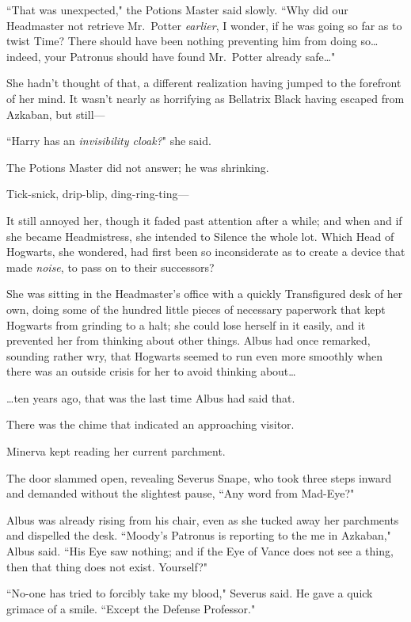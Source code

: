 ``That was unexpected," the Potions Master said slowly. ``Why did our Headmaster not retrieve Mr.~Potter \emph{earlier}, I wonder, if he was going so far as to twist Time? There should have been nothing preventing him from doing so{\ldots} indeed, your Patronus should have found Mr.~Potter already safe{\ldots}"

She hadn't thought of that, a different realization having jumped to the forefront of her mind. It wasn't nearly as horrifying as Bellatrix Black having escaped from Azkaban, but still—

``Harry has an \emph{invisibility cloak?}" she said.

The Potions Master did not answer; he was shrinking.

\later

Tick-snick, drip-blip, ding-ring-ting---

It still annoyed her, though it faded past attention after a while; and when and if she became Headmistress, she intended to Silence the whole lot. Which Head of Hogwarts, she wondered, had first been so inconsiderate as to create a device that made \emph{noise}, to pass on to their successors?

She was sitting in the Headmaster's office with a quickly Transfigured desk of her own, doing some of the hundred little pieces of necessary paperwork that kept Hogwarts from grinding to a halt; she could lose herself in it easily, and it prevented her from thinking about other things. Albus had once remarked, sounding rather wry, that Hogwarts seemed to run even more smoothly when there was an outside crisis for her to avoid thinking about{\ldots}

{\ldots}ten years ago, that was the last time Albus had said that.

There was the chime that indicated an approaching visitor.

Minerva kept reading her current parchment.

The door slammed open, revealing Severus Snape, who took three steps inward and demanded without the slightest pause, ``Any word from Mad-Eye?"

Albus was already rising from his chair, even as she tucked away her parchments and dispelled the desk. ``Moody's Patronus is reporting to the me in Azkaban," Albus said. ``His Eye saw nothing; and if the Eye of Vance does not see a thing, then that thing does not exist. Yourself?"

``No-one has tried to forcibly take my blood," Severus said. He gave a quick grimace of a smile. ``Except the Defense Professor."

